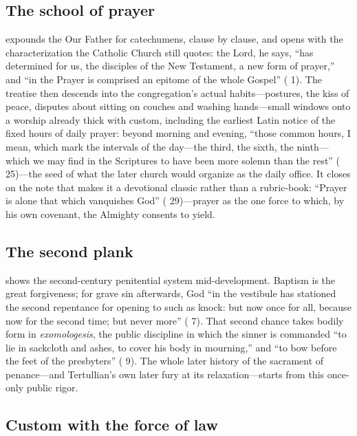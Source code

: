 \subsection{The school of prayer}

 expounds the Our Father for catechumens, clause by clause,
and opens with the characterization the Catholic Church still quotes: the
Lord, he says, ``has determined for us, the disciples of the New Testament, a
new form of prayer,'' and ``in the Prayer is comprised an epitome of the whole
Gospel'' ( 1). The treatise then descends into the
congregation's actual habits---postures, the kiss of peace, disputes about
sitting on couches and washing hands---small windows onto a worship already
thick with custom, including the earliest Latin notice of the fixed hours of
daily prayer: beyond morning and evening, ``those common hours, I mean, which
mark the intervals of the day---the third, the sixth, the ninth---which we
may find in the Scriptures to have been more solemn than the rest''
( 25)---the seed of what the later church would organize as
the daily office. It closes on the note that makes it a
devotional classic rather than a rubric-book: ``Prayer is alone that which
vanquishes God'' ( 29)---prayer as the one force to which,
by his own covenant, the Almighty consents to yield.

\subsection{The second plank}

 shows the second-century penitential system mid-development.
Baptism is the great forgiveness; for grave sin afterwards, God ``in the
vestibule has stationed the second repentance for opening to such as knock: but
now once for all, because now for the second time; but never more'' ( 7). That second chance takes bodily form in \textit{exomologesis},
the public discipline in which the sinner is commanded ``to lie in sackcloth
and ashes, to cover his body in mourning,'' and ``to bow before the feet of the
presbyters'' ( 9). The whole later history of the sacrament
of penance---and Tertullian's own later fury at its relaxation---starts from
this once-only public rigor.

\subsection{Custom with the force of law}

